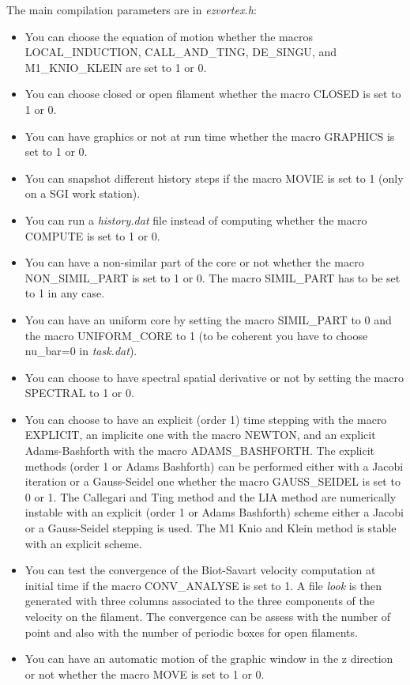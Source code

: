 The main compilation parameters are in {\em ezvortex.h}:
\begin{itemize}
\item You can choose the equation of motion whether the macros {\sf LOCAL\_INDUCTION}, {\sf CALL\_AND\_TING}, {\sf DE\_SINGU}, and {\sf  M1\_KNIO\_KLEIN} are set to 1 or 0. 
\item You can choose closed or open filament whether the macro {\sf CLOSED} is set to 1 or 0. 
\item You can have graphics or not at run time whether the macro {\sf GRAPHICS}  is set to 1 or 0. 
\item You can snapshot different history steps if  the macro {\sf MOVIE} is set to 1 (only on a SGI work station). 
\item You can run a {\em history.dat} file instead of computing whether the macro {\sf COMPUTE} is set to 1 or 0.
\item You can have a non-similar part of the core or not  whether the macro {\sf NON\_SIMIL\_PART} is set to 1 or 0. The macro {\sf SIMIL\_PART} has to be set to 1 in any case.
\item You can have an uniform core by setting the macro {\sf SIMIL\_PART} to 0 and the macro {\sf UNIFORM\_CORE}  to 1 (to be coherent you have to choose {\sf nu\_bar=0} in {\em task.dat}). 
\item You can choose to have spectral spatial derivative or not by setting the macro {\sf SPECTRAL} to 1 or 0.
\item You can choose to have an explicit (order 1) time stepping with the macro {\sf EXPLICIT}, an implicite one with the macro {\sf NEWTON}, and an explicit Adams-Bashforth with the macro {\sf ADAMS\_BASHFORTH}. The explicit  methods (order 1 or Adams Bashforth) can be performed either with a Jacobi iteration or a Gauss-Seidel one whether the macro {\sf GAUSS\_SEIDEL} is set to 0 or 1. The Callegari and Ting method and the LIA method are numerically instable with an explicit (order 1 or Adams Bashforth) scheme either a Jacobi or a Gauss-Seidel stepping is used. The M1 Knio and Klein method is stable with an explicit scheme.
\item You can test the convergence of the Biot-Savart velocity computation at initial time if the macro {\sf CONV\_ANALYSE} is set to 1. A file {\em look} is then generated with three columns associated to the three components of the velocity on the filament. The convergence can be assess with the number of point and also with the number of periodic boxes for open filaments. 
\item You can have an automatic motion of the graphic window in the z direction or not whether the macro {\sf MOVE} is set to 1 or 0.
\end{itemize}

